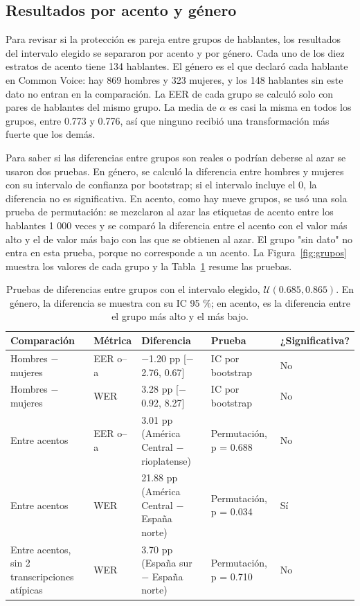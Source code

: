 \documentclass[10pt,twocolumn]{article}
\begin{document}
\subsection{Resultados por acento y género}\label{sec:5.5}

Para revisar si la protección es pareja entre grupos de hablantes, los resultados del intervalo elegido se separaron por acento y por género. Cada uno de los diez estratos de acento tiene 134 hablantes. El género es el que declaró cada hablante en Common Voice: hay 869 hombres y 323 mujeres, y los 148 hablantes sin este dato no entran en la comparación. La EER de cada grupo se calculó solo con pares de hablantes del mismo grupo. La media de $\alpha$ es casi la misma en todos los grupos, entre 0.773 y 0.776, así que ninguno recibió una transformación más fuerte que los demás.

Para saber si las diferencias entre grupos son reales o podrían deberse al azar se usaron dos pruebas. En género, se calculó la diferencia entre hombres y mujeres con su intervalo de confianza por bootstrap; si el intervalo incluye el 0, la diferencia no es significativa. En acento, como hay nueve grupos, se usó una sola prueba de permutación: se mezclaron al azar las etiquetas de acento entre los hablantes 1 000 veces y se comparó la diferencia entre el acento con el valor más alto y el de valor más bajo con las que se obtienen al azar. El grupo "sin dato" no entra en esta prueba, porque no corresponde a un acento. La Figura~\ref{fig:grupos} muestra los valores de cada grupo y la Tabla~\ref{tab:resultados_grupos} resume las pruebas.

\begin{table}[!tbp]
\centering
\caption{Pruebas de diferencias entre grupos con el intervalo elegido, $\mathcal{U}(0.685, 0.865)$. En género, la diferencia se muestra con su IC 95 \%; en acento, es la diferencia entre el grupo más alto y el más bajo.}
\label{tab:resultados_grupos}
\footnotesize
\setlength{\tabcolsep}{4pt}
\renewcommand{\arraystretch}{1.14}
\begin{tabularx}{\textwidth}{@{}>{\raggedright\arraybackslash}p{3.15cm}>{\raggedright\arraybackslash}p{1.7cm}X>{\raggedright\arraybackslash}p{3cm}p{1.9cm}@{}}
\toprule
\textbf{Comparación} & \textbf{Métrica} & \textbf{Diferencia} & \textbf{Prueba} & \textbf{¿Significativa?} \\
\midrule
Hombres $-$ mujeres & EER o--a & $-$1.20 pp [$-$2.76, 0.67] & IC por bootstrap & No \\
Hombres $-$ mujeres & WER & 3.28 pp [$-$0.92, 8.27] & IC por bootstrap & No \\
Entre acentos & EER o--a & 3.01 pp (América Central $-$ rioplatense) & Permutación, p = 0.688 & No \\
Entre acentos & WER & 21.88 pp (América Central $-$ España norte) & Permutación, p = 0.034 & Sí \\
Entre acentos, sin 2 transcripciones atípicas & WER & 3.70 pp (España sur $-$ España norte) & Permutación, p = 0.710 & No \\
\bottomrule
\end{tabularx}
\end{table}
\end{document}

